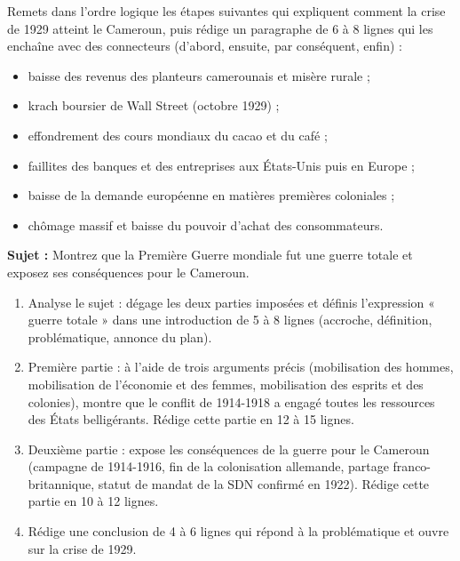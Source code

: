 \documentclass[11pt]{article}
\newcounter{popsec}
\newcounter{popsub}
\newcommand{\courssub}[1]{%
  \stepcounter{popsub}%
  \par\vspace{9pt}\noindent{\popxbold\fontsize{11.5}{13}\selectfont\color{popink}{\color{poporange}\thepopsec.\thepopsub}\hspace{6pt}#1}\par\nopagebreak\vspace{4pt}
}
\begin{document}
\begin{exercice}
Remets dans l'ordre logique les étapes suivantes qui expliquent comment la crise de 1929 atteint le Cameroun, puis rédige un paragraphe de 6 à 8 lignes qui les enchaîne avec des connecteurs (d'abord, ensuite, par conséquent, enfin) :
\begin{itemize}
\item baisse des revenus des planteurs camerounais et misère rurale ;
\item krach boursier de Wall Street (octobre 1929) ;
\item effondrement des cours mondiaux du cacao et du café ;
\item faillites des banques et des entreprises aux États-Unis puis en Europe ;
\item baisse de la demande européenne en matières premières coloniales ;
\item chômage massif et baisse du pouvoir d'achat des consommateurs.
\end{itemize}
\end{exercice}

\courssub{Je me prépare au Bac}

\begin{exercice}
\textbf{Sujet :} Montrez que la Première Guerre mondiale fut une guerre totale et exposez ses conséquences pour le Cameroun.
\begin{enumerate}
\item Analyse le sujet : dégage les deux parties imposées et définis l'expression « guerre totale » dans une introduction de 5 à 8 lignes (accroche, définition, problématique, annonce du plan).
\item Première partie : à l'aide de trois arguments précis (mobilisation des hommes, mobilisation de l'économie et des femmes, mobilisation des esprits et des colonies), montre que le conflit de 1914-1918 a engagé toutes les ressources des États belligérants. Rédige cette partie en 12 à 15 lignes.
\item Deuxième partie : expose les conséquences de la guerre pour le Cameroun (campagne de 1914-1916, fin de la colonisation allemande, partage franco-britannique, statut de mandat de la SDN confirmé en 1922). Rédige cette partie en 10 à 12 lignes.
\item Rédige une conclusion de 4 à 6 lignes qui répond à la problématique et ouvre sur la crise de 1929.
\end{enumerate}
\end{exercice}
\end{document}
